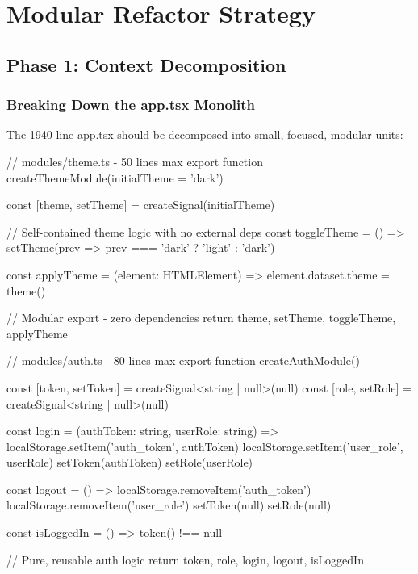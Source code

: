 \documentclass[11pt]{article}
\begin{document}
\section{Modular Refactor Strategy}

\subsection{Phase 1: Context Decomposition}

\subsubsection{Breaking Down the app.tsx Monolith}

The 1940-line app.tsx should be decomposed into small, focused, modular units:

\begin{typescriptcode}
// modules/theme.ts - 50 lines max
export function createThemeModule(initialTheme = 'dark') {
  const [theme, setTheme] = createSignal(initialTheme)
  
  // Self-contained theme logic with no external deps
  const toggleTheme = () => setTheme(prev => 
    prev === 'dark' ? 'light' : 'dark')
  
  const applyTheme = (element: HTMLElement) => {
    element.dataset.theme = theme()
  }
  
  // Modular export - zero dependencies
  return { theme, setTheme, toggleTheme, applyTheme }
}
\end{typescriptcode}

\begin{typescriptcode}
// modules/auth.ts - 80 lines max
export function createAuthModule() {
  const [token, setToken] = createSignal<string | null>(null)
  const [role, setRole] = createSignal<string | null>(null)
  
  const login = (authToken: string, userRole: string) => {
    localStorage.setItem('auth_token', authToken)
    localStorage.setItem('user_role', userRole)
    setToken(authToken)
    setRole(userRole)
  }
  
  const logout = () => {
    localStorage.removeItem('auth_token')
    localStorage.removeItem('user_role')
    setToken(null)
    setRole(null)
  }
  
  const isLoggedIn = () => token() !== null
  
  // Pure, reusable auth logic
  return { token, role, login, logout, isLoggedIn }
}
\end{typescriptcode}
\end{document}
